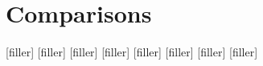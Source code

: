 \section{Comparisons}
\label{sec:comparisons}

[filler]
[filler]
[filler]
[filler]
[filler]
[filler]
[filler]
[filler]

